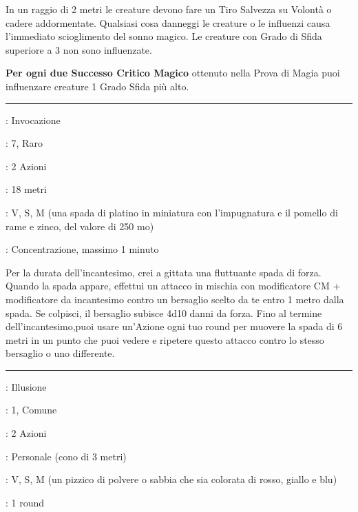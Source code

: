 \begin{multicols}{2}
In un raggio di 2 metri le creature devono fare un Tiro Salvezza su Volontà o cadere addormentate. Qualsiasi cosa danneggi le creature o le influenzi causa l'immediato scioglimento del sonno magico. Le creature con Grado di Sfida superiore a 3 non sono influenzate.

\textbf{Per ogni due Successo Critico Magico} ottenuto nella Prova di Magia puoi influenzare creature 1 Grado Sfida più alto.

\smallskip\noindent\rule{\linewidth}{2pt} \hypertarget{Spada Arcana}{}\medskip{}
\noindent
\begin{description}[noitemsep, topsep=0pt, parsep=0pt, partopsep=0pt, leftmargin=0cm, labelwidth=2.8cm]
	\item[\textbf{Lista di Magia}]: Invocazione
	\item[\textbf{Livello}]: 7, Raro
	\item[\textbf{T. di Lancio}]: 2 Azioni
	\item[\textbf{Gittata}]: 18 metri
	\item[\textbf{Componenti}]: V, S, M (una spada di platino in miniatura con l'impugnatura e il pomello di rame e zinco, del valore di 250 mo)
	\item[\textbf{Durata}]: Concentrazione, massimo 1 minuto
\end{description}

Per la durata dell'incantesimo, crei a gittata una fluttuante spada di forza. Quando la spada appare, effettui un attacco in mischia con modificatore CM + modificatore da incantesimo contro un bersaglio scelto da te entro 1 metro dalla spada. Se colpisci, il bersaglio subisce 4d10 danni da forza. Fino al termine dell'incantesimo,puoi usare un'Azione ogni tuo round per muovere la spada di 6 metri in un punto che puoi vedere e ripetere questo attacco contro lo stesso bersaglio o uno differente.

\smallskip\noindent\rule{\linewidth}{2pt} \hypertarget{Spruzzo Colorato}{}\medskip{}
\noindent
\begin{description}[noitemsep, topsep=0pt, parsep=0pt, partopsep=0pt, leftmargin=0cm, labelwidth=2.8cm]
	\item[\textbf{Lista di Magia}]: Illusione
	\item[\textbf{Livello}]: 1, Comune
	\item[\textbf{T. di Lancio}]: 2 Azioni
	\item[\textbf{Gittata}]: Personale (cono di 3 metri)
	\item[\textbf{Componenti}]: V, S, M (un pizzico di polvere o sabbia che sia colorata di rosso, giallo e blu)
	\item[\textbf{Durata}]: 1 round
\end{description}


\end{multicols}
